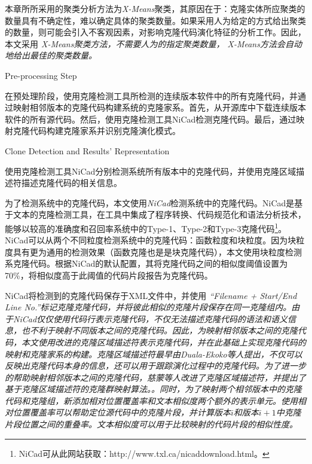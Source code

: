本章所所采用的聚类分析方法为{\em X-Means}\cite{pelleg2000x}聚类，其原因在于：克隆实体所应聚类的数量具有不确定性，难以确定具体的聚类数量。如果采用人为给定的方式给出聚类的数量，则可能会引入不客观因素，对影响克隆代码演化特征的分析工作。因此，本文采用\em{ X-Means}聚类方法，不需要人为的指定聚类数量，\em{ X-Means}方法会自动地给出最佳的聚类数量。

{ Pre-processing Step}

在预处理阶段，使用克隆检测工具所检测的连续版本软件中的所有克隆代码，并通过映射相邻版本的克隆代码构建系统的克隆家系。首先，从开源库中下载连续版本软件的所有源代码。然后，使用克隆检测工具NiCad检测克隆代码。最后，通过映射克隆代码构建克隆家系并识别克隆演化模式。

{Clone Detection and Results’ Representation}

使用克隆检测工具NiCad分别检测系统所有版本中的克隆代码，并使用克隆区域描述符描述克隆代码的相关信息。

为了检测系统中的克隆代码，本文使用{\em NiCad}\cite{roy2008nicad}检测系统中的克隆代码。NiCad是基于文本的克隆检测工具，在工具中集成了程序转换、代码规范化和语法分析技术\cite{cordy2006txl}\cite{dean2003agile}，能够以较高的准确度和召回率系统中的Type-1、Type-2和Type-3克隆代码\footnote{NiCad可从此网站获取：http://www.txl.ca/nicaddownload.html。}。NiCad可以从两个不同粒度检测系统中的克隆代码：函数粒度和块粒度。因为块粒度具有更为通用的检测效果（函数克隆也是是块克隆代码），本文使用{块粒度}检测系克隆代码。根据NiCad的默认配置，其将克隆代码之间的相似度阈值设置为70\%，将相似度高于此阈值的代码片段报告为克隆代码。


NiCad将检测到的克隆代码保存于XML文件中，并使用\em{ ``Filename + Start/End Line No.''}标记克隆克隆代码，并将彼此相似的克隆片段保存在同一克隆组内。由于NiCad仅仅使用代码行表示克隆代码，不仅无法描述克隆代码的语法和语义信息，也不利于映射不同版本之间的克隆代码。因此，为映射相邻版本之间的克隆代码，本文使用改进的克隆区域描述符表示克隆代码，并在此基础上实现克隆代码的映射和克隆家系的构建。克隆区域描述符最早由Duala-Ekoko等人提出，不仅可以反映出克隆代码本身的信息，还可以用于跟踪演化过程中的克隆代码\cite{duala2010clone}。为了进一步的帮助映射相邻版本之间的克隆代码，慈蒙等人改进了克隆区域描述符，并提出了基于克隆区域描述符的克隆群映射算法\cite{ci2013new}\cite{ci2013newD}。\cite{ci2013new}\cite{ci2013newD}。同时，为了映射两个相邻版本中的克隆代码和克隆组，新添加相对位置覆盖率和文本相似度两个额外的表示单元。使用相对位置覆盖率可以帮助定位源代码中的克隆片段，并计算版本$i$和版本$i+1$中克隆片段位置之间的重叠率。文本相似度可以用于比较映射的代码片段的相似性度。

